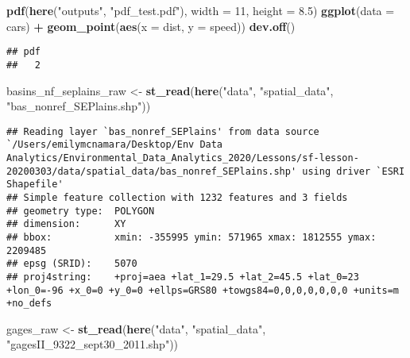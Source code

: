 \documentclass[]{article}
\newenvironment{Shaded}{\begin{snugshade}}{\end{snugshade}}
\newcommand{\KeywordTok}[1]{\textcolor[rgb]{0.13,0.29,0.53}{\textbf{#1}}}
\newcommand{\DataTypeTok}[1]{\textcolor[rgb]{0.13,0.29,0.53}{#1}}
\newcommand{\DecValTok}[1]{\textcolor[rgb]{0.00,0.00,0.81}{#1}}
\newcommand{\FloatTok}[1]{\textcolor[rgb]{0.00,0.00,0.81}{#1}}
\newcommand{\StringTok}[1]{\textcolor[rgb]{0.31,0.60,0.02}{#1}}
\newcommand{\OperatorTok}[1]{\textcolor[rgb]{0.81,0.36,0.00}{\textbf{#1}}}
\newcommand{\NormalTok}[1]{#1}
\begin{document}
\begin{Shaded}
\begin{Highlighting}[]
\KeywordTok{pdf}\NormalTok{(}\KeywordTok{here}\NormalTok{(}\StringTok{"outputs"}\NormalTok{, }\StringTok{"pdf_test.pdf"}\NormalTok{), }\DataTypeTok{width =} \DecValTok{11}\NormalTok{, }\DataTypeTok{height =} \FloatTok{8.5}\NormalTok{)}
\KeywordTok{ggplot}\NormalTok{(}\DataTypeTok{data =}\NormalTok{ cars) }\OperatorTok{+}
\StringTok{  }\KeywordTok{geom_point}\NormalTok{(}\KeywordTok{aes}\NormalTok{(}\DataTypeTok{x =}\NormalTok{ dist, }\DataTypeTok{y =}\NormalTok{ speed))}
\KeywordTok{dev.off}\NormalTok{()}
\end{Highlighting}
\end{Shaded}

\begin{verbatim}
## pdf 
##   2
\end{verbatim}

\begin{Shaded}
\begin{Highlighting}[]
\NormalTok{basins_nf_seplains_raw <-}\StringTok{ }\KeywordTok{st_read}\NormalTok{(}\KeywordTok{here}\NormalTok{(}\StringTok{"data"}\NormalTok{, }\StringTok{"spatial_data"}\NormalTok{, }\StringTok{"bas_nonref_SEPlains.shp"}\NormalTok{))}
\end{Highlighting}
\end{Shaded}

\begin{verbatim}
## Reading layer `bas_nonref_SEPlains' from data source `/Users/emilymcnamara/Desktop/Env Data Analytics/Environmental_Data_Analytics_2020/Lessons/sf-lesson-20200303/data/spatial_data/bas_nonref_SEPlains.shp' using driver `ESRI Shapefile'
## Simple feature collection with 1232 features and 3 fields
## geometry type:  POLYGON
## dimension:      XY
## bbox:           xmin: -355995 ymin: 571965 xmax: 1812555 ymax: 2209485
## epsg (SRID):    5070
## proj4string:    +proj=aea +lat_1=29.5 +lat_2=45.5 +lat_0=23 +lon_0=-96 +x_0=0 +y_0=0 +ellps=GRS80 +towgs84=0,0,0,0,0,0,0 +units=m +no_defs
\end{verbatim}

\begin{Shaded}
\begin{Highlighting}[]
\NormalTok{gages_raw <-}\StringTok{ }\KeywordTok{st_read}\NormalTok{(}\KeywordTok{here}\NormalTok{(}\StringTok{"data"}\NormalTok{, }\StringTok{"spatial_data"}\NormalTok{, }\StringTok{"gagesII_9322_sept30_2011.shp"}\NormalTok{))}
\end{Highlighting}
\end{Shaded}
\end{document}
